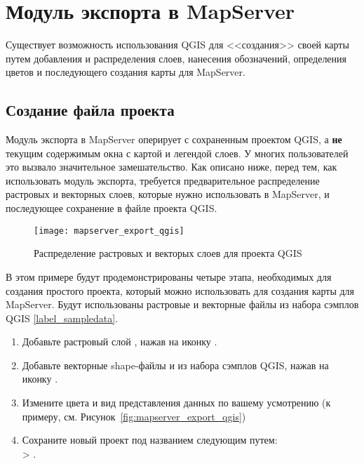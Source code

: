 
\section{Модуль экспорта в MapServer}\label{sec:mapserver_export}


Существует возможность использования QGIS для <<создания>> своей карты
путем добавления и распределения слоев, нанесения обозначений,
определения цветов и последующего создания карты для MapServer.

\subsection{Создание файла проекта}

Модуль экспорта в MapServer оперирует с сохраненным проектом QGIS, а
\textbf{не} текущим содержимым окна с картой и легендой слоев. У
многих пользователей это вызвало значительное замешательство. Как
описано ниже, перед тем, как использовать модуль экспорта, требуется
предварительное распределение растровых и векторных слоев, которые нужно
использовать в MapServer, и последующее сохранение в файле проекта QGIS.

\begin{figure}[ht]
\centering
  \texttt{[image: mapserver\_export\_qgis]}
   \caption{Распределение растровых и векторых слоев для проекта QGIS \nixcaption}
  \label{fig:mapserver_export_qgs}
\end{figure}

В этом примере будут продемонстрированы четыре этапа, необходимых для
создания простого проекта, который можно использовать для создания карты
для MapServer. Будут использованы растровые и векторные файлы из набора
сэмплов QGIS \ref{label_sampledata}.

\begin{enumerate}
\item Добавьте растровый слой , нажав на иконку
.
\item Добавьте векторные shape-файлы 
и  из набора сэмплов QGIS, нажав на иконку
.
\item Измените цвета и вид представления данных по вашему усмотрению
(к примеру, см. Рисунок~\ref{fig:mapserver_export_qgis})
\item Сохраните новый проект под названием 
следующим путем: \\
 > .
\end{enumerate}

